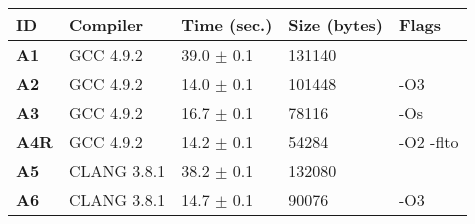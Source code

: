     \begin{tabular}{|l|l|l|l|p{3.2in}|}
     \hline
      \textbf{ID} & \textbf{Compiler} & \textbf{Time (sec.)} & \textbf{Size (bytes)} & \textbf{Flags} \\ 
     \hline
      \textbf{ A1 } &  GCC 4.9.2  &  39.0 $\pm$ 0.1  &  131140  & {\small  }\\
     \hline
      \textbf{ A2 } &  GCC 4.9.2  &  14.0 $\pm$ 0.1  &  101448  & {\small -O3 }\\
     \hline
      \textbf{ A3 } &  GCC 4.9.2  &  16.7 $\pm$ 0.1  &  78116  & {\small -Os }\\
     \hline
      \textbf{ A4R } &  GCC 4.9.2  &  14.2 $\pm$ 0.1  &  54284  & {\small -O2 -flto }\\
     \hline
      \textbf{ A5 } &  CLANG 3.8.1  &  38.2 $\pm$ 0.1  &  132080  & {\small  }\\
     \hline
      \textbf{ A6 } &  CLANG 3.8.1  &  14.7 $\pm$ 0.1  &  90076  & {\small -O3 }\\
     \hline
    \end{tabular}    